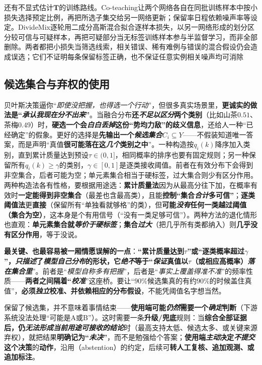 还有不显式估计$\bm T$的训练路线。Co-teaching让两个网络各自在同批训练样本中按小损失选择预定比例，再把所选子集交给另一网络更新；保留率日程依赖噪声率等设定。DivideMix逐轮用二成分高斯混合拟合逐样本损失，以另一网络形成的划分区分较可信与可疑样本，再把可疑部分当无标签训练样本参与半监督学习，而非全部删除。两者都把小损失当筛选线索，相关错误、稀有难例与错误的混合假设仍会造成误选；它们不证明每条保留标签正确，也不保证任意实例相关噪声均可消除

\subsection{候选集合与弃权的使用}
\label{sec:knowledge-fusion-set-abstention-use}

贝叶斯决策逼你“\emph{即使没把握，也得\emph{选一个}行动}”，但很多真实场景里，\textbf{更诚实的做法是“\emph{承认我现在分不出来}”}。当融合分布\textbf{还\emph{不足以区分}两个类别}（比如山茶$0.51$、茶梅$0.49$）时，\textbf{硬选一个会\emph{白白丢掉}这份“势均力敌”的歧义信息}，还给人一种“已经确定”的假象。更好的选择是\textbf{先输出一个\emph{候选集合}}$C_i\subseteq Y$——不假装知道唯一答案，而是声明“真值\textbf{很可能落在这\emph{几个}类别之中}”。一种构造按$q_i(k)$降序加入类别，直到累计质量达到预设$\tau\in(0,1]$，相同概率的排序也要有固定规则；另一种保留所有$q_i(k)\geq\gamma$的类别，$\gamma\in[0,1]$是逐类接收阈值。前者在有效分布下会得到非空集合，后者可能为空；单元素集合相当于硬标签，过大集合则少有区分作用。两种构造法各有性格，要根据用途选：\textbf{累计质量法}因为从最高分往下加，在概率有效时\textbf{一定能得到非空集合}（最差也含最高类），且能\textbf{控制“集合\emph{合计}多可信”}；\textbf{逐类阈值法}更\textbf{直接}（保留所有“单独看就够格”的类），但\textbf{可能\emph{没有}任何一类越过阈值（集合为空）}，这本身是个有用信号（“没有一类足够可信”）。两种方法的退化情形也直观：\textbf{单元素集合就\emph{等价于硬标签}}；\textbf{集合\emph{过大}}（把几乎所有类都纳入）则\textbf{几乎没有区分作用}，等于没说。

\textbf{最关键、也最容易被一厢情愿误解的一点}：\textbf{“累计质量达到$\tau$”或“逐类概率超过$\gamma$”，\emph{只描述}了\emph{模型自己分布}的形状，它\emph{绝不}等于“\emph{保证}真值以$\tau$（或相应高概率）\emph{落在集合里}}”。前者是“\emph{模型\emph{自称}多有把握}”，后者是“\emph{事实上\emph{覆盖}得准不准}”的频率性质——\textbf{两者之间隔着“\emph{校准}}”这座桥。要让“$90\%$候选集真的有约$90\%$的时候盖住真值”，\textbf{必须\emph{独立}校准、并依赖相应的分布假设}，不能凭阈值名字想当然。

保留了候选集，并不意味着事情结束——\textbf{使用端可能\emph{仍然}需要一个\emph{确定}判断}（下游系统没法处理“可能是A或B”）。这时需要一条\textbf{升级/兜底}规则：当\textbf{综合全部证据后，仍\emph{无法形成当前用途\emph{可接收}的结论}}时（最高支持太低、候选太多、或关键来源弃权），就把结果\textbf{明确记为“\emph{未决}”}，而不是勉强给个答案；\textbf{使用端\emph{主动}决定\emph{不提交}这个决策}的\textbf{动作}，沿用（abstention）的约定，后续可\textbf{转人工复核、追加观测、或追加标注}。

